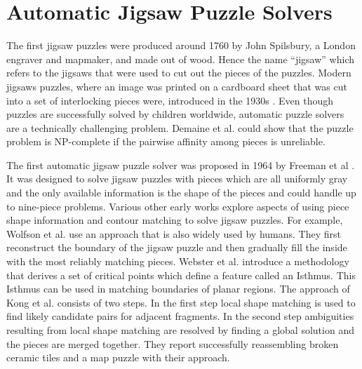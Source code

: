 \documentclass[11pt]{report}
\begin{document}
\section{Automatic Jigsaw Puzzle Solvers}
The first jigsaw puzzles were produced around 1760 by John Spilsbury, a
London engraver and mapmaker, and made out of wood.
Hence the name ``jigsaw'' which refers to the jigsaws that were used to cut out
the pieces of the puzzles. Modern jigsaws puzzles, where an image was printed on
a cardboard sheet that was cut into a set of interlocking pieces were, introduced
in the 1930s \cite{williams2004jigsaw}. Even though puzzles are successfully
solved by children worldwide, automatic puzzle solvers are a technically
challenging problem. Demaine et al. \cite{demaine2007jigsaw} could show that the
puzzle problem is NP-complete if the pairwise affinity among pieces is
unreliable.

The first automatic jigsaw puzzle solver was proposed in 1964 by Freeman et al
\cite{freeman1964apictorial}. It was designed to solve jigsaw puzzles with
pieces which are all uniformly gray and the only available information is the
shape of the pieces and could handle up to nine-piece problems. Various other
early works explore aspects of using piece shape information and contour
matching to solve jigsaw puzzles. For example, Wolfson et al. \cite{wolfson1988solving}
use an approach that is also widely used by humans. They first reconstruct the boundary of
the jigsaw puzzle and then gradually fill the inside with the most reliably matching
pieces. Webster et al. \cite{webster1990computer} introduce a methodology that
derives a set of critical points which define a feature called an Isthmus. This
Isthmus can be used in matching boundaries of planar regions. The approach of
Kong et al. \cite{kong2001solving} consists of two steps. In the first step
local shape matching is used to find likely candidate pairs for adjacent
fragments. In the second step ambiguities resulting from local shape matching
are resolved by finding a global solution and the pieces are merged together.
They report successfully reassembling broken ceramic tiles and a map puzzle with
their approach.
\end{document}
